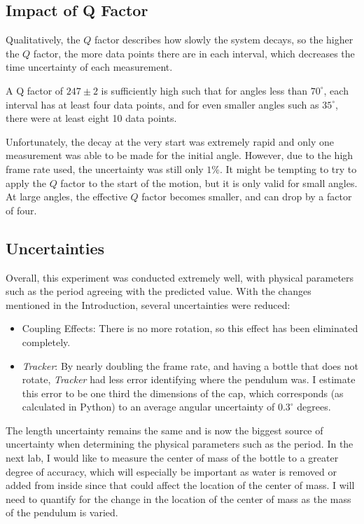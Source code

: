 \documentclass[%
 reprint,
 amsmath,amssymb
 aps,
]{revtex4-2}
\begin{document}
\subsection{Impact of Q Factor}
Qualitatively, the $Q$ factor describes how slowly the system decays, so the higher the $Q$ factor, the more data points there are in each interval, which decreases the time uncertainty of each measurement.

A Q factor of $247\pm 2$ is sufficiently high such that for angles less than $70^\circ$, each interval has at least four data points, and for even smaller angles such as $35^\circ$, there were at least eight 10 data points.

Unfortunately, the decay at the very start was extremely rapid and only one measurement was able to be made for the initial angle. However, due to the high frame rate used, the uncertainty was still only $1\%$. It might be tempting to try to apply the $Q$ factor to the start of the motion, but it is only valid for small angles. At large angles, the effective $Q$ factor becomes smaller, and can drop by a factor of four.
\subsection{Uncertainties}
Overall, this experiment was conducted extremely well, with physical parameters such as the period agreeing with the predicted value. With the changes mentioned in the Introduction, several uncertainties were reduced:
\begin{itemize}
    \item Coupling Effects: There is no more rotation, so this effect has been eliminated completely.
    \item \textit{Tracker}: By nearly doubling the frame rate, and having a bottle that does not rotate, \textit{Tracker} had less error identifying where the pendulum was. I estimate this error to be one third the dimensions of the cap, which corresponds (as calculated in Python) to an average angular uncertainty of $0.3^\circ$ degrees.
\end{itemize}
The length uncertainty remains the same and is now the biggest source of uncertainty when determining the physical parameters such as the period. In the next lab, I would like to measure the center of mass of the bottle to a greater degree of accuracy, which will especially be important as water is removed or added from inside since that could affect the location of the center of mass. I will need to quantify for the change in the location of the center of mass as the mass of the pendulum is varied.
\end{document}
